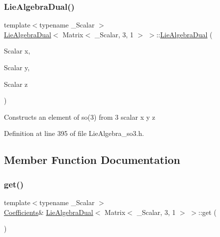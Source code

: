 \subsubsection{\texorpdfstring{Lie\+Algebra\+Dual()}{LieAlgebraDual()}\hspace{0.1cm}{\footnotesize\ttfamily [4/4]}}
{\footnotesize\ttfamily template$<$typename \+\_\+\+Scalar $>$ \\
\hyperlink{class_lie_algebra_dual}{Lie\+Algebra\+Dual}$<$ Matrix$<$ \+\_\+\+Scalar, 3, 1 $>$ $>$\+::\hyperlink{class_lie_algebra_dual}{Lie\+Algebra\+Dual} (\begin{DoxyParamCaption}\item[{Scalar}]{x,  }\item[{Scalar}]{y,  }\item[{Scalar}]{z }\end{DoxyParamCaption})\hspace{0.3cm}{\ttfamily [inline]}}

Constructs an element of so(3) from 3 scalar {\ttfamily x} {\ttfamily y} {\ttfamily z} 

Definition at line 395 of file Lie\+Algebra\+\_\+so3.\+h.



\subsection{Member Function Documentation}
\hypertarget{class_lie_algebra_dual_3_01_matrix_3_01___scalar_00_013_00_011_01_4_01_4_a9bad4e5052a104271c6566e1f9ac3f68}{}\label{class_lie_algebra_dual_3_01_matrix_3_01___scalar_00_013_00_011_01_4_01_4_a9bad4e5052a104271c6566e1f9ac3f68} 
\subsubsection{\texorpdfstring{get()}{get()}\hspace{0.1cm}{\footnotesize\ttfamily [1/2]}}
{\footnotesize\ttfamily template$<$typename \+\_\+\+Scalar $>$ \\
\hyperlink{class_lie_algebra_dual_3_01_matrix_3_01___scalar_00_013_00_011_01_4_01_4_ae90a3999d66fafefffe5538cd72985ee}{Coefficients}\& \hyperlink{class_lie_algebra_dual}{Lie\+Algebra\+Dual}$<$ Matrix$<$ \+\_\+\+Scalar, 3, 1 $>$ $>$\+::get (\begin{DoxyParamCaption}{ }\end{DoxyParamCaption})\hspace{0.3cm}{\ttfamily [inline]}}

